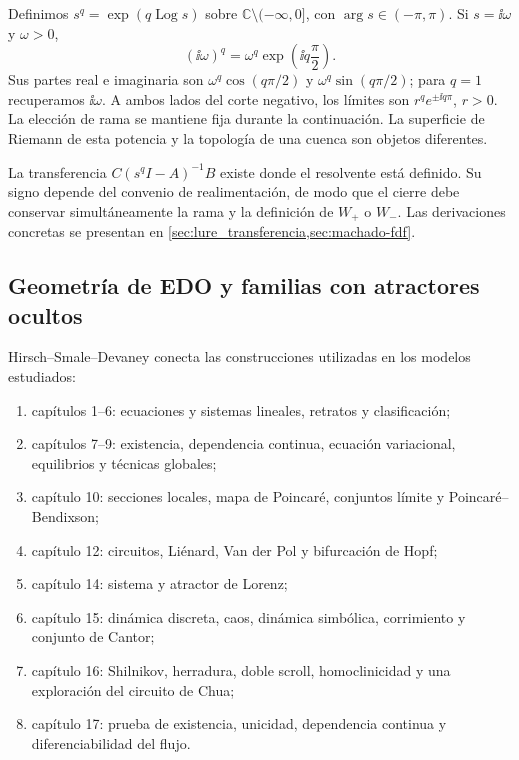 Definimos $s^q=\exp(q\operatorname{Log}s)$ sobre
$\mathbb C\setminus(-\infty,0]$, con $\arg s\in(-\pi,\pi)$. Si
$s=\ii\omega$ y $\omega>0$,
\begin{equation}
 (\ii\omega)^q=\omega^q\exp\!\left(\ii q\frac\pi2\right).
 \label{eq:library-principal-branch}
\end{equation}
Sus partes real e imaginaria son $\omega^q\cos(q\pi/2)$ y
$\omega^q\sin(q\pi/2)$; para $q=1$ recuperamos $\ii\omega$. A ambos
lados del corte negativo, los límites son $r^qe^{\pm\ii q\pi}$,
$r>0$. La elección de rama se mantiene fija durante la continuación.
La superficie de Riemann de esta potencia y la topología de una cuenca
son objetos diferentes.

La transferencia $C(s^qI-A)^{-1}B$ existe donde el resolvente está definido.
Su signo depende del convenio de realimentación, de modo que el cierre debe
conservar simultáneamente la rama y la definición de $W_+$ o $W_-$.
Las derivaciones concretas se presentan en
\cref{sec:lure_transferencia,sec:machado-fdf}.

\subsection{Geometría de EDO y familias con atractores ocultos}

Hirsch--Smale--Devaney
\cite{HirschSmaleDevaney2013} conecta las construcciones utilizadas en los
modelos estudiados:
\begin{enumerate}
 \item capítulos 1--6: ecuaciones y sistemas lineales, retratos y
 clasificación;
 \item capítulos 7--9: existencia, dependencia continua, ecuación variacional,
 equilibrios y técnicas globales;
 \item capítulo 10: secciones locales, mapa de Poincaré, conjuntos límite y
 Poincaré--Bendixson;
 \item capítulo 12: circuitos, Liénard, Van der Pol y bifurcación de Hopf;
 \item capítulo 14: sistema y atractor de Lorenz;
 \item capítulo 15: dinámica discreta, caos, dinámica simbólica, corrimiento y
 conjunto de Cantor;
 \item capítulo 16: Shilnikov, herradura, doble scroll, homoclinicidad y una
 exploración del circuito de Chua;
 \item capítulo 17: prueba de existencia, unicidad, dependencia continua y
 diferenciabilidad del flujo.
\end{enumerate}

